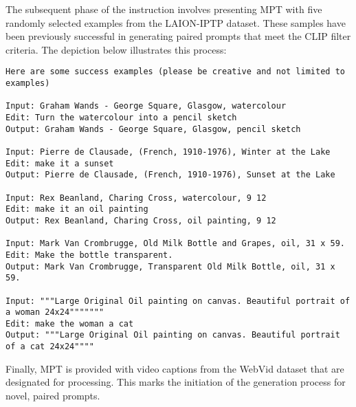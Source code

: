 The subsequent phase of the instruction involves presenting MPT with five randomly selected examples from the LAION-IPTP dataset. These samples have been previously successful in generating paired prompts that meet the CLIP filter criteria. The depiction below illustrates this process:

\begin{Verbatim}[breaklines=true]
Here are some success examples (please be creative and not limited to examples)

Input: Graham Wands - George Square, Glasgow, watercolour
Edit: Turn the watercolour into a pencil sketch
Output: Graham Wands - George Square, Glasgow, pencil sketch

Input: Pierre de Clausade, (French, 1910-1976), Winter at the Lake
Edit: make it a sunset
Output: Pierre de Clausade, (French, 1910-1976), Sunset at the Lake

Input: Rex Beanland, Charing Cross, watercolour, 9 12
Edit: make it an oil painting
Output: Rex Beanland, Charing Cross, oil painting, 9 12

Input: Mark Van Crombrugge, Old Milk Bottle and Grapes, oil, 31 x 59.
Edit: Make the bottle transparent.
Output: Mark Van Crombrugge, Transparent Old Milk Bottle, oil, 31 x 59.

Input: """Large Original Oil painting on canvas. Beautiful portrait of a woman 24x24"""""""
Edit: make the woman a cat
Output: """Large Original Oil painting on canvas. Beautiful portrait of a cat 24x24""""

\end{Verbatim}


Finally, MPT is provided with video captions from the WebVid dataset that are designated for processing. This marks the initiation of the generation process for novel, paired prompts.

